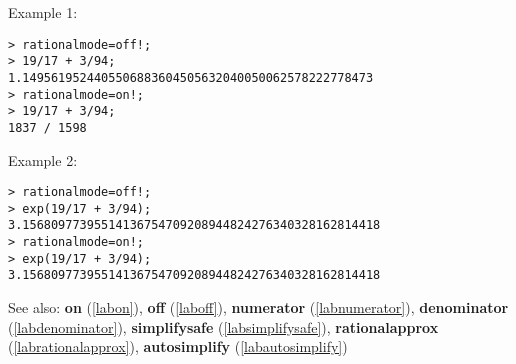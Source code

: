 \noindent Example 1: 
\begin{center}\begin{minipage}{15cm}\begin{Verbatim}[frame=single]
> rationalmode=off!;
> 19/17 + 3/94;
1.1495619524405506883604505632040050062578222778473
> rationalmode=on!;
> 19/17 + 3/94;
1837 / 1598
\end{Verbatim}
\end{minipage}\end{center}
\noindent Example 2: 
\begin{center}\begin{minipage}{15cm}\begin{Verbatim}[frame=single]
> rationalmode=off!;
> exp(19/17 + 3/94);
3.15680977395514136754709208944824276340328162814418
> rationalmode=on!;
> exp(19/17 + 3/94);
3.15680977395514136754709208944824276340328162814418
\end{Verbatim}
\end{minipage}\end{center}
See also: \textbf{on} (\ref{labon}), \textbf{off} (\ref{laboff}), \textbf{numerator} (\ref{labnumerator}), \textbf{denominator} (\ref{labdenominator}), \textbf{simplifysafe} (\ref{labsimplifysafe}), \textbf{rationalapprox} (\ref{labrationalapprox}), \textbf{autosimplify} (\ref{labautosimplify})
